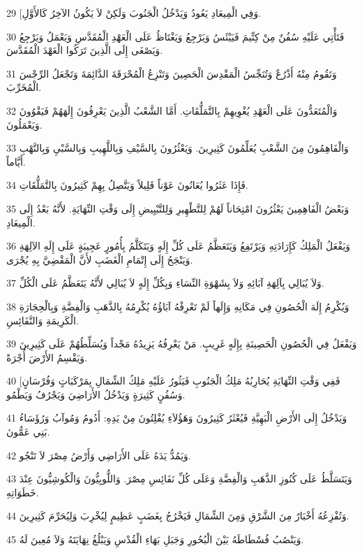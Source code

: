 \par 29 [وَفِي الْمِيعَادِ يَعُودُ وَيَدْخُلُ الْجَنُوبَ وَلَكِنْ لاَ يَكُونُ الآخِرُ كَالأَوَّلِ.
\par 30 فَتَأْتِي عَلَيْهِ سُفُنٌ مِنْ كِتِّيمَ فَيَيْئَسُ وَيَرْجِعُ وَيَغْتَاظُ عَلَى الْعَهْدِ الْمُقَدَّسِ وَيَعْمَلُ وَيَرْجِعُ وَيَصْغَى إِلَى الَّذِينَ تَرَكُوا الْعَهْدَ الْمُقَدَّسَ.
\par 31 وَتَقُومُ مِنْهُ أَذْرُعٌ وَتُنَجِّسُ الْمَقْدِسَ الْحَصِينَ وَتَنْزِعُ الْمُحْرَقَةَ الدَّائِمَةَ وَتَجْعَلُ الرِّجْسَ الْمُخَرِّبَ.
\par 32 وَالْمُتَعَدُّونَ عَلَى الْعَهْدِ يُغْوِيهِمْ بِالتَّمَلُّقَاتِ. أَمَّا الشَّعْبُ الَّذِينَ يَعْرِفُونَ إِلَهَهُمْ فَيَقْوُونَ وَيَعْمَلُونَ.
\par 33 وَالْفَاهِمُونَ مِنَ الشَّعْبِ يُعَلِّمُونَ كَثِيرِينَ. وَيَعْثُرُونَ بِالسَّيْفِ وَبِاللَّهِيبِ وَبِالسَّبْيِ وَبِالنَّهْبِ أَيَّاماً.
\par 34 فَإِذَا عَثَرُوا يُعَانُونَ عَوْناً قَلِيلاً وَيَتَّصِلُ بِهِمْ كَثِيرُونَ بِالتَّمَلُّقَاتِ.
\par 35 وَبَعْضُ الْفَاهِمِينَ يَعْثُرُونَ امْتِحَاناً لَهُمْ لِلتَّطْهِيرِ وَلِلتَّبْيِيضِ إِلَى وَقْتِ النِّهَايَةِ. لأَنَّهُ بَعْدُ إِلَى الْمِيعَادِ.
\par 36 وَيَفْعَلُ الْمَلِكُ كَإِرَادَتِهِ وَيَرْتَفِعُ وَيَتَعَظَّمُ عَلَى كُلِّ إِلَهٍ وَيَتَكَلَّمُ بِأُمُورٍ عَجِيبَةٍ عَلَى إِلَهِ الآلِهَةِ وَيَنْجَحُ إِلَى إِتْمَامِ الْغَضَبِ لأَنَّ الْمَقْضِيَّ بِهِ يُجْرَى.
\par 37 وَلاَ يُبَالِي بِآلِهَةِ آبَائِهِ وَلاَ بِشَهْوَةِ النِّسَاءِ وَبِكُلِّ إِلَهٍ لاَ يُبَالِي لأَنَّهُ يَتَعَظَّمُ عَلَى الْكُلِّ.
\par 38 وَيُكْرِمُ إِلَهَ الْحُصُونِ فِي مَكَانِهِ وَإِلَهاً لَمْ تَعْرِفْهُ آبَاؤُهُ يُكْرِمُهُ بِالذَّهَبِ وَالْفِضَّةِ وَبِالْحِجَارَةِ الْكَرِيمَةِ وَالنَّفَائِسِ.
\par 39 وَيَفْعَلُ فِي الْحُصُونِ الْحَصِينَةِ بِإِلَهٍ غَرِيبٍ. مَنْ يَعْرِفُهُ يَزِيدُهُ مَجْداً وَيُسَلِّطُهُمْ عَلَى كَثِيرِينَ وَيَقْسِمُ الأَرْضَ أُجْرَةً.
\par 40 [فَفِي وَقْتِ النِّهَايَةِ يُحَارِبُهُ مَلِكُ الْجَنُوبِ فَيَثُورُ عَلَيْهِ مَلِكُ الشِّمَالِ بِمَرْكَبَاتٍ وَفُرْسَانٍ وَسُفُنٍ كَثِيرَةٍ وَيَدْخُلُ الأَرَاضِيَ وَيَجْرُفُ وَيَطْمُو.
\par 41 وَيَدْخُلُ إِلَى الأَرْضِ الْبَهِيَّةِ فَيُعْثَرُ كَثِيرُونَ وَهَؤُلاَءِ يُفْلِتُونَ مِنْ يَدِهِ: أَدُومُ وَمُوآبُ وَرُؤَسَاءُ بَنِي عَمُّونَ.
\par 42 وَيَمُدُّ يَدَهُ عَلَى الأَرَاضِي وَأَرْضُ مِصْرَ لاَ تَنْجُو.
\par 43 وَيَتَسَلَّطُ عَلَى كُنُوزِ الذَّهَبِ وَالْفِضَّةِ وَعَلَى كُلِّ نَفَائِسِ مِصْرَ. وَاللُّوبِيُّونَ وَالْكُوشِيُّونَ عِنْدَ خَطَوَاتِهِ.
\par 44 وَتُفْزِعُهُ أَخْبَارٌ مِنَ الشَّرْقِ وَمِنَ الشِّمَالِ فَيَخْرُجُ بِغَضَبٍ عَظِيمٍ لِيُخْرِبَ وَلِيُحَرِّمَ كَثِيرِينَ.
\par 45 وَيَنْصُبُ فُسْطَاطَهُ بَيْنَ الْبُحُورِ وَجَبَلِ بَهَاءِ الْقُدْسِ وَيَبْلُغُ نِهَايَتَهُ وَلاَ مُعِينَ لَهُ.

